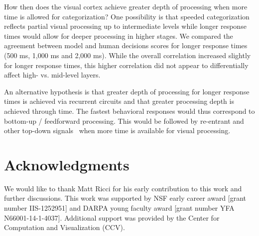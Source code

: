 \documentclass{article}
\begin{document}
How then does the visual cortex achieve greater depth of processing when more time is allowed for categorization? One possibility is that speeded categorization reflects partial visual processing up to intermediate levels while longer response times would allow for deeper processing in higher stages. We compared the agreement between model and human decisions scores for longer response times (500 ms, 1,000 ms and 2,000 ms).  While the overall correlation increased slightly for longer response times, this higher correlation did not appear to differentially affect  high- vs. mid-level layers. 

An alternative hypothesis is that greater depth of processing for longer response times is achieved via recurrent circuits and that greater processing depth is achieved through time. The fastest behavioral responses would thus correspond to bottom-up / feedforward processing. This would be followed by re-entrant and other top-down signals~\citep{Gilbert2013} when more time is available for visual processing.



\section*{Acknowledgments}


We would like to thank Matt Ricci for his early contribution to this work and further discussions. This work was supported by NSF early career award [grant number IIS-1252951] and DARPA young faculty award [grant number YFA N66001-14-1-4037]. Additional support was provided by the Center for Computation and Visualization (CCV). 




\end{document}
